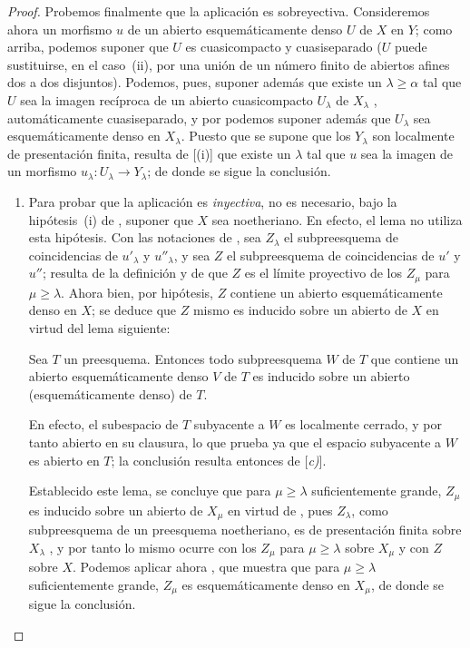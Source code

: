 \begin{proof}
Probemos finalmente que la aplicación  es sobreyectiva.
Consideremos ahora un morfismo $u$ de un abierto esquemáticamente denso $U$ de $X$ en $Y$; como arriba, podemos suponer que $U$ es cuasicompacto y cuasiseparado ($U$ puede sustituirse, en el caso~(ii), por una unión de un número finito de abiertos afines dos a dos disjuntos).
Podemos, pues, suponer además que existe un $\lambda\geq\alpha$ tal que $U$ sea la imagen recíproca de un abierto cuasicompacto $U_\lambda$ de $X_\lambda$ , automáticamente cuasiseparado, y por  podemos suponer además que $U_\lambda$ sea esquemáticamente denso en $X_\lambda$.
Puesto que se supone que los $Y_\lambda$ son localmente de presentación finita, resulta de [(i)] que existe un $\lambda$ tal que $u$ sea la imagen de un morfismo $u_\lambda:U_\lambda\to Y_\lambda$; de donde se sigue la conclusión.

\begin{remarks}[20.3.8.7]
\label{IV.20.3.8.7}
\begin{enumerate}[label=(\roman*)]
  \item Para probar que la aplicación  es \emph{inyectiva}, no es necesario, bajo la hipótesis~(i) de , suponer que $X$ sea noetheriano.
  En efecto, el lema  no utiliza esta hipótesis.
  Con las notaciones de , sea $Z_\lambda$ el subpreesquema de coincidencias de $u'_\lambda$ y $u''_\lambda$, y sea $Z$ el subpreesquema de coincidencias de $u'$ y $u''$; resulta de la definición  y de  que $Z$ es el límite proyectivo de los $Z_\mu$ para $\mu\geq\lambda$.
  Ahora bien, por hipótesis, $Z$ contiene un abierto esquemáticamente denso en $X$; se deduce que $Z$ mismo es inducido sobre un abierto de $X$ en virtud del lema siguiente:

\begin{lemma}[20.3.8.8]
\label{IV.20.3.8.8}
Sea $T$ un preesquema.
Entonces todo subpreesquema $W$ de $T$ que contiene un abierto esquemáticamente denso $V$ de $T$ es inducido sobre un abierto (esquemáticamente denso) de $T$.
\end{lemma}

  En efecto, el subespacio de $T$ subyacente a $W$ es localmente cerrado, y por tanto abierto
  en su clausura, lo que prueba ya que el espacio subyacente a $W$ es abierto en $T$; la conclusión resulta entonces de [\emph{c)}].

  Establecido este lema, se concluye que para $\mu\geq\lambda$ suficientemente grande, $Z_\mu$ es inducido sobre un abierto de $X_\mu$ en virtud de , pues $Z_\lambda$, como subpreesquema de un preesquema noetheriano, es de presentación finita sobre $X_\lambda$ , y por tanto lo mismo ocurre con los $Z_\mu$ para $\mu\geq\lambda$ sobre $X_\mu$ y con $Z$ sobre $X$.
  Podemos aplicar ahora , que muestra que para $\mu\geq\lambda$ suficientemente grande, $Z_\mu$ es esquemáticamente denso en $X_\mu$, de donde se sigue la conclusión.


\end{enumerate}
\end{remarks}
\end{proof}

